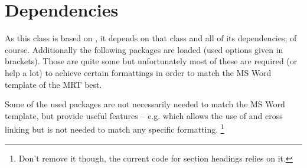 \section{Dependencies}\label{sec:thesis:dep}%
As this class is based on , it depends on that class and all of
its dependencies, of course. Additionally the following packages are loaded
(used options given in brackets). Those are quite some but unfortunately most of
these are required (or help a lot) to achieve certain formattings in order to
match the MS Word template of the MRT best.

Some of the used packages are not necessarily needed to match the MS Word
template, but provide useful features -- e.g.   which allows the
use of  and cross linking but is not needed to match any specific
formatting.%
\footnote
  {Don't remove it though, the current code for section headings relies on it.}

